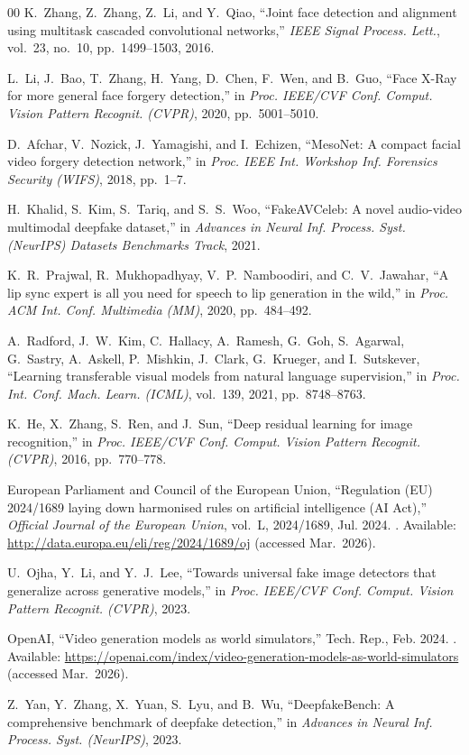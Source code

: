 \documentclass[conference]{IEEEtran}
\begin{document}
\begin{thebibliography}{00}
K.~Zhang, Z.~Zhang, Z.~Li, and Y.~Qiao, ``Joint face detection and alignment using multitask cascaded convolutional networks,'' \emph{IEEE Signal Process. Lett.}, vol.~23, no.~10, pp.~1499--1503, 2016.

L.~Li, J.~Bao, T.~Zhang, H.~Yang, D.~Chen, F.~Wen, and B.~Guo, ``Face {X-Ray} for more general face forgery detection,'' in \emph{Proc. IEEE/CVF Conf. Comput. Vision Pattern Recognit. (CVPR)}, 2020, pp.~5001--5010.

D.~Afchar, V.~Nozick, J.~Yamagishi, and I.~Echizen, ``{MesoNet}: A compact facial video forgery detection network,'' in \emph{Proc. IEEE Int. Workshop Inf. Forensics Security (WIFS)}, 2018, pp.~1--7.

H.~Khalid, S.~Kim, S.~Tariq, and S.~S.~Woo, ``{FakeAVCeleb}: A novel audio-video multimodal deepfake dataset,'' in \emph{Advances in Neural Inf. Process. Syst. (NeurIPS) Datasets Benchmarks Track}, 2021.

K.~R.~Prajwal, R.~Mukhopadhyay, V.~P.~Namboodiri, and C.~V.~Jawahar, ``A lip sync expert is all you need for speech to lip generation in the wild,'' in \emph{Proc. ACM Int. Conf. Multimedia (MM)}, 2020, pp.~484--492.

A.~Radford, J.~W.~Kim, C.~Hallacy, A.~Ramesh, G.~Goh, S.~Agarwal, G.~Sastry, A.~Askell, P.~Mishkin, J.~Clark, G.~Krueger, and I.~Sutskever, ``Learning transferable visual models from natural language supervision,'' in \emph{Proc. Int. Conf. Mach. Learn. (ICML)}, vol.~139, 2021, pp.~8748--8763.

K.~He, X.~Zhang, S.~Ren, and J.~Sun, ``Deep residual learning for image recognition,'' in \emph{Proc. IEEE/CVF Conf. Comput. Vision Pattern Recognit. (CVPR)}, 2016, pp.~770--778.

European Parliament and Council of the European Union, ``Regulation ({EU}) 2024/1689 laying down harmonised rules on artificial intelligence ({AI Act}),'' \emph{Official Journal of the European Union}, vol.~L, 2024/1689, Jul. 2024.
\newblock [Online]. Available: \url{http://data.europa.eu/eli/reg/2024/1689/oj} (accessed Mar.~2026).

U.~Ojha, Y.~Li, and Y.~J.~Lee, ``Towards universal fake image detectors that generalize across generative models,'' in \emph{Proc. IEEE/CVF Conf. Comput. Vision Pattern Recognit. (CVPR)}, 2023.

OpenAI, ``Video generation models as world simulators,'' Tech. Rep., Feb. 2024.
\newblock [Online]. Available: \url{https://openai.com/index/video-generation-models-as-world-simulators} (accessed Mar.~2026).

Z.~Yan, Y.~Zhang, X.~Yuan, S.~Lyu, and B.~Wu, ``{DeepfakeBench}: A comprehensive benchmark of deepfake detection,'' in \emph{Advances in Neural Inf. Process. Syst. (NeurIPS)}, 2023.

\end{thebibliography}
\end{document}
